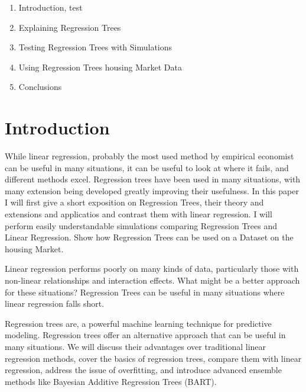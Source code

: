 \documentclass[12pt]{article}
\begin{document}
\onehalfspacing                  	




\begin{enumerate}
    \item Introduction, test
    \item Explaining Regression Trees
    \item Testing Regression Trees with Simulations
    \item Using Regression Trees housing Market Data
    \item Conclusions
\end{enumerate}


\section{Introduction}
While linear regression, probably the most used method by empirical economist can be useful in many situations, it can be useful to look at where it fails, and different methods excel. Regression trees have been used in many situations, with many extension being developed greatly improving their usefulness. In this paper I will first give a short exposition on Regression Trees, their theory and extensions and applicatios and contrast them with linear regression. I will perform easily understandable simulations comparing Regression Trees and Linear Regression. Show how Regression Trees can be used on a Dataset on the housing Market.



Linear regression performs poorly on many kinds of data, particularly those with non-linear relationships and interaction effects. What might be a better approach for these situations? Regression Trees can be useful in many situations where linear regression falls short.

Regression trees are, a powerful machine learning technique for predictive modeling. Regression trees offer an alternative approach that can be useful in many situations. We will discuss their advantages over traditional linear regression methods, cover the basics of regression trees, compare them with linear regression, address the issue of overfitting, and introduce advanced ensemble methods like Bayesian Additive Regression Trees (BART).
\end{document}
